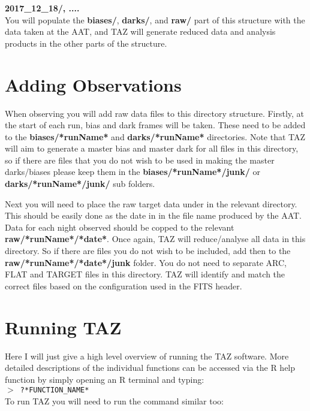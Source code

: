 \documentclass[12pt]{article}
\begin{document}
\hspace{20mm} \textbf{2017\_12\_18/, ....} \\

You will populate the \textbf{biases/}, \textbf{darks/}, and \textbf{raw/} part of this structure with the data taken at the AAT, and TAZ will generate reduced data and analysis products in the other parts of the structure. 


\section{Adding Observations}

When observing you will add raw data files to this directory structure. Firstly, at the start of each run, bias and dark frames will be taken. These need to be added to the \textbf{biases/*runName*} and \textbf{darks/*runName*} directories. Note that TAZ will aim to generate a master bias and master dark for all files in this directory, so if there are files that you do not wish to be used in making the master darks/biases please keep them in the  \textbf{biases/*runName*/junk/} or \textbf{darks/*runName*/junk/} sub folders.

Next you will need to place the raw target data under in the relevant directory. This should be easily done as the date in in the file name produced by the AAT. Data for each night observed should be copped to the relevant \textbf{raw/*runName*/*date*}. Once again, TAZ will reduce/analyse all data in this directory. So if there are files you do not wish to be included, add then to the \textbf{raw/*runName*/*date*/junk} folder. You do not need to separate ARC, FLAT and TARGET files in this directory. TAZ will identify and match the correct files based on the configuration used in the FITS header.    

\section{Running TAZ}

Here I will just give a high level overview of running the TAZ software. More detailed descriptions of the individual functions can be accessed via the R help function by simply opening an R terminal and typing: \\


\hspace{10mm}  \texttt{$>$ ?*FUNCTION\_NAME*}\\

To run TAZ you will need to run the command similar too: \\
\end{document}
